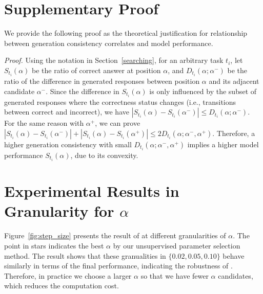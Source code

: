 \begin{table}[h]
   
    \caption{Altered prompt for evaluation on OK-VQA.}
    \label{tab:prompt}
\end{table}

\section{Supplementary Proof}
\label{appendix:proof}

We provide the following proof as the theoretical justification for relationship between generation consistency correlates and model performance.

\noindent\textit{Proof.} Using the notation in Section~\ref{searching}, for an arbitrary task $t_i$, let $S_{t_i}(\alpha)$ be the ratio of correct answer at position $\alpha$, and $D_{t_i}(\alpha; \alpha^-)$ be the ratio of the difference in generated responses between position $\alpha$ and its adjacent candidate $\alpha^-$.
Since the difference in $S_{t_i}(\alpha)$ is only influenced  by the subset of generated responses where the correctness status changes (i.e., transitions between correct and incorrect), we have $|S_{t_i}(\alpha)-S_{t_i}(\alpha^-)| \leq D_{t_i}(\alpha; \alpha^-)$. For the same reason with $\alpha^+$, we can prove  $|S_{t_i}(\alpha)-S_{t_i}(\alpha^-)| + |S_{t_i}(\alpha)-S_{t_i}(\alpha^+)| \leq 2D_{t_i}(\alpha; \alpha^-, \alpha^+)$.
Therefore, a higher generation consistency with small $D_{t_i}(\alpha; \alpha^-, \alpha^+)$ implies a higher model performance $S_{t_i}(\alpha)$, due to its convexity.

\section{Experimental Results in Granularity for \texorpdfstring{$\alpha$}{alpha}}
\label{appendix:granularity}

Figure~\ref{fig:step_size} presents the result of \ours at different granularities of $\alpha$. The point in stars indicates the best $\alpha$ by our unsupervised parameter selection method. The result shows that these granualities in $\{0.02, 0.05, 0.10\}$ behave similarly in terms of the final performance, indicating the robustness of \ours. Therefore, in practice we choose a larger $\alpha$ so that we have fewer $\alpha$ candidates, which reduces the computation cost.

